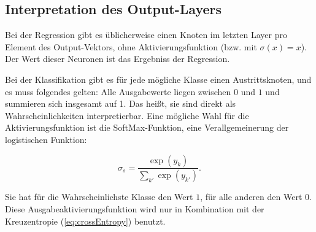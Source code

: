 \subsection{Interpretation des Output-Layers}
Bei der Regression gibt es üblicherweise einen Knoten im letzten Layer pro Element des Output-Vektors, ohne Aktivierungsfunktion (bzw. mit $\sigma(x) = x$). Der Wert dieser Neuronen ist das Ergebniss der Regression. 

Bei der Klassifikation gibt es für jede mögliche Klasse einen Austrittsknoten, und es muss folgendes gelten:
Alle Ausgabewerte liegen zwischen $0$ und $1$ und summieren sich insgesamt auf 1.
Das heißt, sie sind direkt als Wahrscheinlichkeiten interpretierbar. Eine mögliche Wahl für die Aktivierungsfunktion ist die SoftMax-Funktion, eine Verallgemeinerung der logistischen Funktion:

\begin{equation}
\label{eq:softmax}
	\sigma_s = \frac{\exp (y_k)}{\sum_{k'} \exp (y_{k'})}.
\end{equation}

Sie hat für die Wahrscheinlichste Klasse den Wert $1$, für alle anderen den Wert $0$. Diese Ausgabeaktivierungsfunktion wird nur in Kombination mit der Kreuzentropie (\ref{eq:crossEntropy}) benutzt\cite{bishop1995neural}. 
